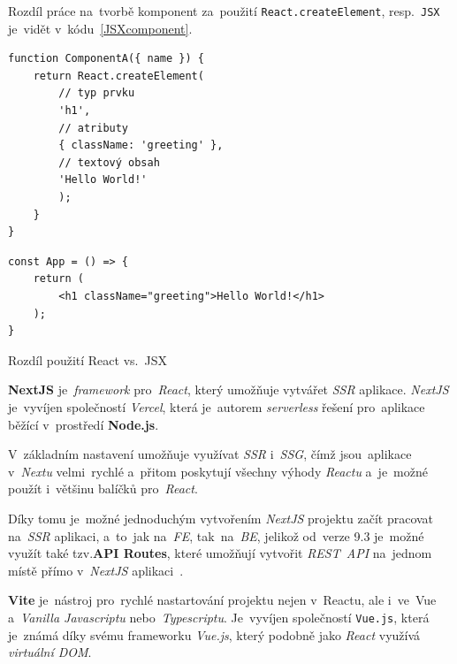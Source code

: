 \documentclass[11pt,a4paper]{report}
\let\oldacrshort\acrshort
\renewcommand{\acrshort}[1]{\emph{\normalsize\color[rgb]{0,0,0}\noindent\oldacrshort{#1}}}
\begin{document}
            Rozdíl práce na~tvorbě komponent za~použití \texttt{React.createElement}, resp.~\texttt{JSX} je~vidět v~kódu~\ref{JSXcomponent}.
            \begin{code}
                \centering
                \begin{minipage}{0.45\textwidth}
                    \begin{verbatim}
function ComponentA({ name }) {
    return React.createElement(
        // typ prvku
        'h1',
        // atributy
        { className: 'greeting' },
        // textový obsah
        'Hello World!'
        );
    }
}
                    \end{verbatim}
                \end{minipage}
                \begin{minipage}{0.45\textwidth}
                    \begin{verbatim}
const App = () => {
    return (
        <h1 className="greeting">Hello World!</h1>
    );
}
                    \end{verbatim}
                \end{minipage}
                \caption{Rozdíl použití React vs.~JSX}
                \label{JSXcomponent}
            \end{code}

            \textbf{NextJS} je~\emph{framework} pro~\emph{React}, který umožňuje vytvářet \emph{SSR} aplikace. \emph{NextJS} je~vyvíjen společností \emph{Vercel}, která je~autorem \emph{serverless} řešení pro~aplikace běžící v~prostředí \textbf{Node.js}.

            V~základním nastavení umožňuje využívat \emph{SSR} i~\acrshort{SSG}, čímž jsou~aplikace v~\emph{Nextu} velmi~rychlé a~přitom poskytují všechny výhody \emph{Reactu} a~je~možné použít i~většinu balíčků pro~\emph{React}.

            Díky tomu je~možné jednoduchým vytvořením \emph{NextJS} projektu začít pracovat na~\emph{SSR} aplikaci, a~to~jak na~\acrshort{FE}, tak~na~\acrshort{BE}, jelikož od~verze 9.3 je~možné využít také tzv.\textbf{API Routes}, které umožňují vytvořit \acrshort{REST}~\acrshort{API} na~jednom místě přímo v~\emph{NextJS} aplikaci~\cite{nextjs, nextjs-api-routes, nextjs-changelog-9-3}.

            \textbf{Vite} je~nástroj pro~rychlé nastartování projektu nejen v~Reactu, ale i~ve~Vue a~\emph{Vanilla Javascriptu} nebo~\emph{Typescriptu}. Je~vyvíjen společností \texttt{Vue.js}, která je~známá díky svému frameworku \emph{Vue.js}, který podobně jako \emph{React} využívá \emph{virtuální DOM}.
\end{document}
